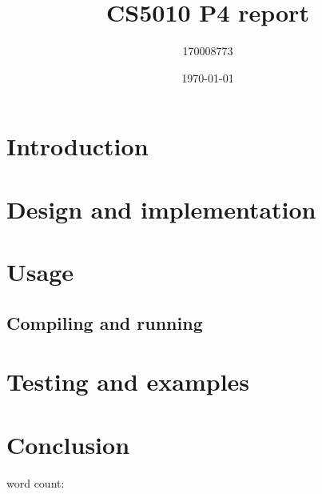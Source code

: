 \documentclass[british]{article}
\title{CS5010 P4 report}
\author{170008773}
\date{\today}
\begin{document}
\maketitle

\section{Introduction}
\label{intro}
\cite{Russel2014}
\section{Design and implementation}
\label{design}

\section{Usage}
\label{usage}
\subsection{Compiling and running}




\section{Testing and examples}
\label{testing}


\section{Conclusion}
\label{conclusion}

 
 
 
word count: 
{}

\end{document}

